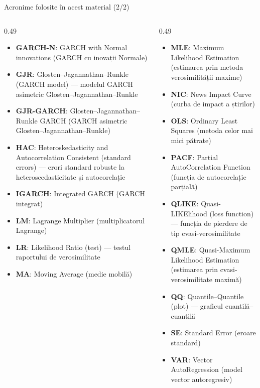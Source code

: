 \begin{frame}{Acronime folosite în acest material (2/2)}
\begin{columns}[T]
\begin{column}{0.49\textwidth}
\begin{itemize}\setlength{\itemsep}{0pt}
    \item \textbf{GARCH-N}: GARCH with Normal innovations (GARCH cu inovații Normale)
    \item \textbf{GJR}: Glosten–Jagannathan–Runkle (GARCH model) — modelul GARCH asimetric Glosten–Jagannathan–Runkle
    \item \textbf{GJR-GARCH}: Glosten–Jagannathan–Runkle GARCH (GARCH asimetric Glosten–Jagannathan–Runkle)
    \item \textbf{HAC}: Heteroskedasticity and Autocorrelation Consistent (standard errors) — erori standard robuste la heteroscedasticitate și autocorelație
    \item \textbf{IGARCH}: Integrated GARCH (GARCH integrat)
    \item \textbf{LM}: Lagrange Multiplier (multiplicatorul Lagrange)
    \item \textbf{LR}: Likelihood Ratio (test) — testul raportului de verosimilitate
    \item \textbf{MA}: Moving Average (medie mobilă)
\end{itemize}
\end{column}
\begin{column}{0.49\textwidth}
\begin{itemize}\setlength{\itemsep}{0pt}
    \item \textbf{MLE}: Maximum Likelihood Estimation (estimarea prin metoda verosimilității maxime)
    \item \textbf{NIC}: News Impact Curve (curba de impact a știrilor)
    \item \textbf{OLS}: Ordinary Least Squares (metoda celor mai mici pătrate)
    \item \textbf{PACF}: Partial AutoCorrelation Function (funcția de autocorelație parțială)
    \item \textbf{QLIKE}: Quasi-LIKElihood (loss function) — funcția de pierdere de tip cvasi-verosimilitate
    \item \textbf{QMLE}: Quasi-Maximum Likelihood Estimation (estimarea prin cvasi-verosimilitate maximă)
    \item \textbf{QQ}: Quantile–Quantile (plot) — graficul cuantilă–cuantilă
    \item \textbf{SE}: Standard Error (eroare standard)
    \item \textbf{VAR}: Vector AutoRegression (model vector autoregresiv)
\end{itemize}
\end{column}
\end{columns}
\end{frame}

